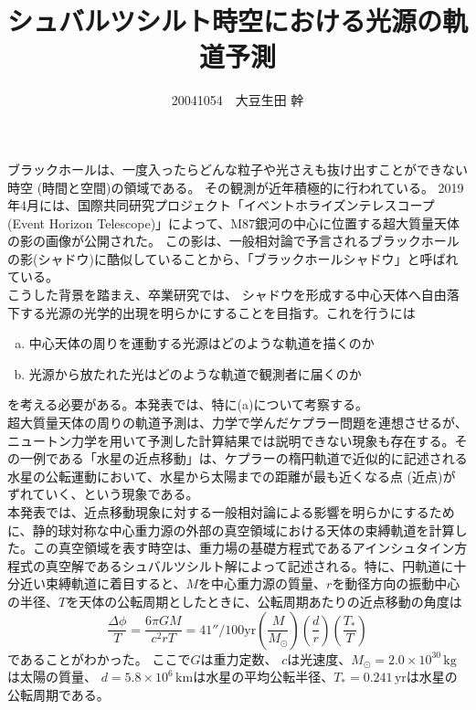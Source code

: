 \documentclass[dvipdfmx]{jsarticle} %
\title{シュバルツシルト時空における光源の軌道予測}
\author{20041054　大豆生田 幹}
\date{}
\begin{document}
\fontsize{14pt}{14pt}\selectfont 
\maketitle

\fontsize{11pt}{11pt}\selectfont 

ブラックホールは、一度入ったらどんな粒子や光さえも抜け出すことができない時空 (時間と空間)の領域である。
その観測が近年積極的に行われている。
2019年4月には、国際共同研究プロジェクト「イベントホライズンテレスコープ (Event Horizon Telescope)」によって、M87銀河の中心に位置する超大質量天体の影の画像が公開された。
この影は、一般相対論で予言されるブラックホールの影(シャドウ)に酷似していることから、「ブラックホールシャドウ」と呼ばれている。\\


こうした背景を踏まえ、卒業研究では、
シャドウを形成する中心天体へ自由落下する光源の光学的出現を明らかにすることを目指す。これを行うには
\begin{enumerate}[(a)\,]
\item 中心天体の周りを運動する光源はどのような軌道を描くのか\\
\item 光源から放たれた光はどのような軌道で観測者に届くのか
\end{enumerate}
を考える必要がある。本発表では、特に(a)について考察する。\\

超大質量天体の周りの軌道予測は、力学で学んだケプラー問題を連想させるが、ニュートン力学を用いて予測した計算結果では説明できない現象も存在する。その一例である「水星の近点移動」は、ケプラーの楕円軌道で近似的に記述される水星の公転運動において、水星から太陽までの距離が最も近くなる点 (近点)がずれていく、という現象である。\\

本発表では、近点移動現象に対する一般相対論による影響を明らかにするために、静的球対称な中心重力源の外部の真空領域における天体の束縛軌道を計算した。この真空領域を表す時空は、重力場の基礎方程式であるアインシュタイン方程式の真空解であるシュバルツシルト解によって記述される。特に、円軌道に十分近い束縛軌道に着目すると、$M$を中心重力源の質量、$r$を動径方向の振動中心の半径、$T$を天体の公転周期としたときに、公転周期あたりの近点移動の角度は
$$
\frac{\Delta \phi}{T} = \frac{6 \pi GM}{c^2rT} 
= 41'' \mathrm{/100yr}
\left( \frac{M}{M_{\odot}} \right) \left( \frac{d}{r} \right)\left( \frac{T_*}{T} \right)
$$
であることがわかった。
ここで$G$は重力定数、
$c$は光速度、$M_{\odot}=2.0\times 10^{30}\mathrm{\,kg}$は太陽の質量、
$d= 5.8\times 10^6 \mathrm{\,km}$は水星の平均公転半径、$T_*=0.241\mathrm{\,yr}$は水星の公転周期である。\\
\end{document}
